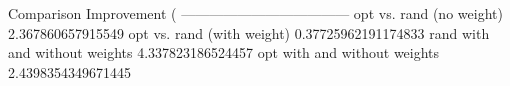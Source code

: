 Comparison	Improvement (%
------------------------------------
opt vs. rand (no weight)	2.367860657915549
opt vs. rand (with weight)	0.37725962191174833
rand with and without weights	4.337823186524457
opt with and without weights	2.4398354349671445
